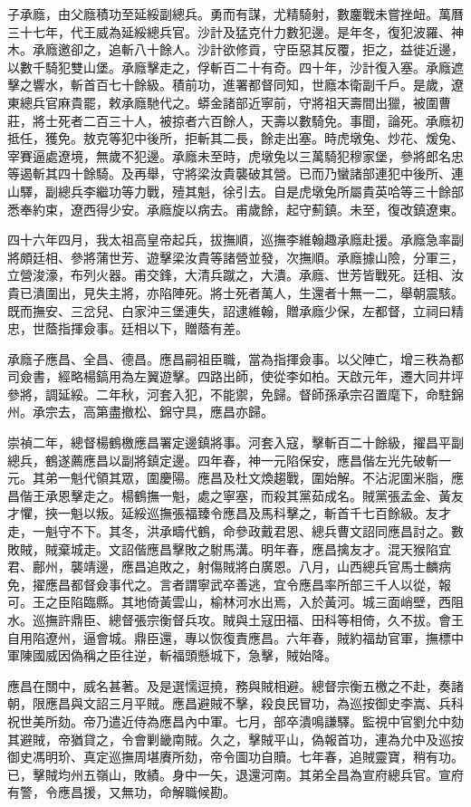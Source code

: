 \begin{pinyinscope}
子承廕，由父廕積功至延綏副總兵。勇而有謀，尤精騎射，數鏖戰未嘗挫衄。萬曆三十七年，代王威為延綏總兵官。沙計及猛克什力數犯邊。是年冬，復犯波羅、神木。承廕邀卻之，追斬八十餘人。沙計欲修貢，守臣惡其反覆，拒之，益徙近邊，以數千騎犯雙山堡。承廕擊走之，俘斬百二十有奇。四十年，沙計復入塞。承廕遮擊之響水，斬首百七十餘級。積前功，進署都督同知，世廕本衛副千戶。是歲，遼東總兵官麻貴罷，敕承廕馳代之。蟒金諸部近寧前，守將祖天壽間出獵，被圍曹莊，將士死者二百三十人，被掠者六百餘人，天壽以數騎免。事聞，論死。承廕初抵任，獲免。敖克等犯中後所，拒斬其二長，餘走出塞。時虎墩兔、炒花、煖兔、宰賽逼處遼境，無歲不犯邊。承廕未至時，虎墩兔以三萬騎犯穆家堡，參將郎名忠等遏斬其四十餘騎。及再舉，守將梁汝貴襲破其營。已而乃蠻諸部連犯中後所、連山驛，副總兵李繼功等力戰，殪其魁，徐引去。自是虎墩兔所屬貴英哈等三十餘部悉奉約束，遼西得少安。承廕旋以病去。甫歲餘，起守薊鎮。未至，復改鎮遼東。

四十六年四月，我太祖高皇帝起兵，拔撫順，巡撫李維翰趣承廕赴援。承廕急率副將頗廷相、參將蒲世芳、遊擊梁汝貴等諸營並發，次撫順。承廕據山險，分軍三，立營浚濠，布列火器。甫交鋒，大清兵蹴之，大潰。承廕、世芳皆戰死。廷相、汝貴已潰圍出，見失主將，亦陷陣死。將士死者萬人，生還者十無一二，舉朝震駭。既而撫安、三岔兒、白家沖三堡連失，詔逮維翰，贈承廕少保，左都督，立祠曰精忠，世蔭指揮僉事。廷相以下，贈蔭有差。

承廕子應昌、全昌、德昌。應昌嗣祖臣職，當為指揮僉事。以父陣亡，增三秩為都司僉書，經略楊鎬用為左翼遊擊。四路出師，使從李如柏。天啟元年，遷大同井坪參將，調延綏。二年秋，河套入犯，不能禦，免歸。督師孫承宗召置麾下，命駐錦州。承宗去，高第盡撤松、錦守具，應昌亦歸。

崇禎二年，總督楊鶴檄應昌署定邊鎮將事。河套入寇，擊斬百二十餘級，擢昌平副總兵，鶴遂薦應昌以副將鎮定邊。四年春，神一元陷保安，應昌偕左光先破斬一元。其弟一魁代領其眾，圍慶陽。應昌及杜文煥趨戰，圍始解。不沾泥圍米脂，應昌偕王承恩擊走之。楊鶴撫一魁，處之寧塞，而殺其黨茹成名。賊黨張孟金、黃友才懼，挾一魁以叛。延綏巡撫張福臻令應昌及馬科擊之，斬首千七百餘級。友才走，一魁守不下。其冬，洪承疇代鶴，命參政戴君恩、總兵曹文詔同應昌討之。數敗賊，賊棄城走。文詔偕應昌擊敗之駙馬溝。明年春，應昌擒友才。混天猴陷宜君、鄜州，襲靖邊，應昌追敗之，射傷賊將白廣恩。八月，山西總兵官馬士麟病免，擢應昌都督僉事代之。言者謂寧武卒善逃，宜令應昌率所部三千人以從，報可。王之臣陷臨縣。其地倚黃雲山，榆林河水出焉，入於黃河。城三面峭壁，西阻水。巡撫許鼎臣、總督張宗衡督兵攻。賊與土寇田福、田科等相倚，久不拔。會王自用陷遼州，逼會城。鼎臣還，專以恢復責應昌。六年春，賊約福劫官軍，撫標中軍陳國威因偽稱之臣往逆，斬福頭懸城下，急擊，賊始降。

應昌在關中，威名甚著。及是選懦逗撓，務與賊相避。總督宗衡五檄之不赴，奏諸朝，限應昌與文詔三月平賊。應昌避賊不擊，殺良民冒功，為巡按御史李嵩、兵科祝世美所劾。帝乃遣近侍為應昌內中軍。七月，部卒潰鳴謙驛。監視中官劉允中劾其避賊，帝猶貸之，令會剿畿南賊。久之，擊賊平山，偽報首功，連為允中及巡按御史馮明玠、真定巡撫周堪賡所劾，帝令圖功自贖。七年春，追賊靈寶，稍有功。已，擊賊均州五嶺山，敗績。身中一矢，退還河南。其弟全昌為宣府總兵官。宣府有警，令應昌援，又無功，命解職候勘。


\end{pinyinscope}
